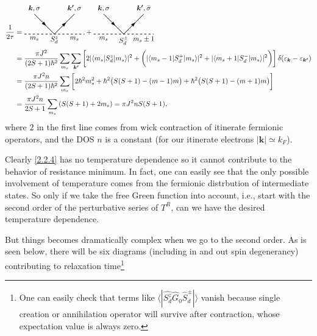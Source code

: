 \documentclass[aps,prx,superscriptaddress,onecolumn,preprintnumbers,nofootinbib,longbibliography]{revtex4-1}
\def\arrow{\tikz[scale=0.1,baseline=.1ex]{
	\draw[fill=black,rotate=-90] (-0.7,0)--(0,2)--(0.7,0);}
	}
\begin{document}
		\begin{align}
			\dfrac{1}{2\tau}&=\begin{tikzpicture}[baseline]
				\draw[thick,dashed] (-1.5,0)--(1.5,0);
				\draw[thick] (-1,1)--(0,0)--(1,1);
				\node[below] at (1,0) {$m_s$};
				\node[below] at (-1,0) {$m_s$};
				\node[below] at (0,0) {$S_d^z$};
				\node[rotate=-45] at (-0.5,0.5) {\arrow};
				\node[above] at (-1,1) {$\bm{k},\sigma$};
				\node[above] at (1,1) {$\bm{k'},\sigma$};
				\node[rotate=45] at (0.5,0.5) {\arrow};
			\end{tikzpicture}+
			\begin{tikzpicture}[baseline]
				\draw[thick,dashed] (-1.5,0)--(1.5,0);
				\draw[thick] (-1,1)--(0,0)--(1,1);
				\node[below] at (1,0) {$m_s\pm1$};
				\node[below] at (-1,0) {$m_s$};
				\node[below] at (0,0) {$S_d^\pm$};
				\node[rotate=-45] at (-0.5,0.5) {\arrow};
				\node[above] at (-1,1) {$\bm{k},\sigma$};
				\node[above] at (1,1) {$\bm{k'},\bar{\sigma}$};
				\node[rotate=45] at (0.5,0.5) {\arrow};
			\end{tikzpicture}\nonumber\\
			&=\dfrac{\pi J^2}{(2S+1)\hbar^2}\sum_{m_s}\sum_{\bm{k'}}\left[2|\langle m_s|S_d^z|m_s\rangle|^2+\bigg(|\langle m_s-1|S_d^+|m_s\rangle|^2+|\langle m_s+1|S_d^-|m_s\rangle|^2\bigg)\right]\delta(\varepsilon_{\bm{k}}-\varepsilon_{\bm{k'}})\nonumber\\
			&=\dfrac{\pi J^2 n}{(2S+1)\hbar^2}\sum_{m_s}\bigg[2\hbar^2m_s^2+\hbar^2\big(S(S+1)-(m-1)m\big)+\hbar^2\big(S(S+1)-(m+1)m\big)\bigg]\nonumber\\
			&=\dfrac{\pi J^2 n}{2S+1}\sum_{m_s}\left(S(S+1)+2m_s\right)=\pi J^2 nS(S+1),\label{2.2.4}
		\end{align}
		where $2$ in the first line comes from wick contraction of itinerate fermionic operators, and the DOS $n$ is a constant (for our itinerate electrons $|\bm{k}|\simeq k_F$).\par
		Clearly \eqref{2.2.4} has no temperature dependence so it cannot contribute to the behavior of resistance minimum. In fact, one can easily see that the only possible involvement of temperature comes from the fermionic distrbution of intermediate states. So only if we take the free Green function into account, i.e., start with the second order of the perturbative series of $T^R$, can we have the desired temperature dependence.\par
		But things becomes dramatically complex when we go to the second order. As is seen below, there will be six diagrams (including in and out spin degenerancy) contributing to relaxation time\footnote{One can easily check that terms like $\langle|\hat{S_d^z}\hat{G}_0\hat{S}_d^\pm|\rangle$ vanish because single creation or annihilation operator will survive after contraction, whose expectation value is always zero.}
\end{document}
